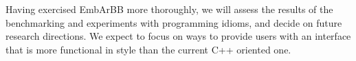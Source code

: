 Having exercised EmbArBB more thoroughly, we will assess the results of 
the benchmarking and experiments with programming idioms, and decide on future
research directions. We expect to focus on ways to provide users with an interface that is more 
functional in style than the current C++ oriented one. 





  
